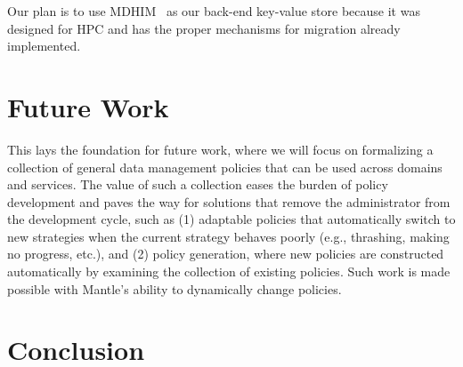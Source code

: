 Our plan is to use MDHIM~\cite{greenberg:hotstorage2015-mdhim} as our back-end
key-value store because it was designed for HPC and has the proper mechanisms
for migration already implemented.  

\section{Future Work}

This lays the foundation for future work, where we will focus on formalizing a
collection of general data management policies that can be used across domains
and services. The value of such a collection eases the burden of policy
development and paves the way for solutions that remove the administrator from
the development cycle, such as (1) adaptable policies that automatically switch
to new strategies when the current strategy behaves poorly ({e.g.}, thrashing,
making no progress, etc.), and (2) policy generation, where new policies are
constructed automatically by examining the collection of existing policies.
Such work is made possible with Mantle's ability to dynamically change
policies.

\section{Conclusion}
